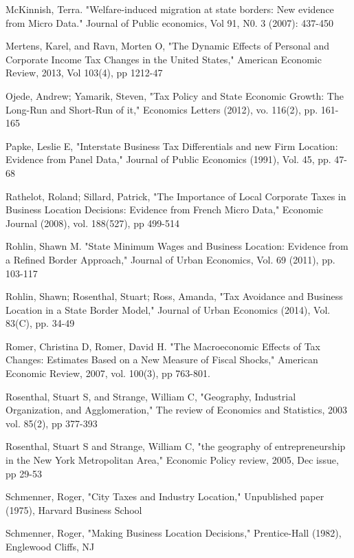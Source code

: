 \documentclass[12pt,a4paper]{article}
\begin{document}
\begin{thebibliography}{99}
McKinnish, Terra. "Welfare-induced migration at state borders: New evidence from Micro Data." Journal of Public economics, Vol 91, N0. 3 (2007): 437-450

Mertens, Karel, and Ravn, Morten O, "The Dynamic Effects of Personal and Corporate Income Tax Changes in the United States," American Economic Review, 2013, Vol 103(4), pp 1212-47

Ojede, Andrew; Yamarik, Steven, "Tax Policy and State Economic Growth: The Long-Run and Short-Run of it," Economics Letters (2012), vo. 116(2), pp. 161-165

Papke, Leslie E, "Interstate Business Tax Differentials and new Firm Location: Evidence from Panel Data," Journal of Public Economics (1991), Vol. 45, pp. 47-68

Rathelot, Roland; Sillard, Patrick, "The Importance of Local Corporate Taxes in Business Location Decisions: Evidence from French Micro Data," Economic Journal (2008), vol. 188(527), pp 499-514

Rohlin, Shawn M. "State Minimum Wages and Business Location: Evidence from a Refined Border Approach," Journal of Urban Economics, Vol. 69 (2011), pp. 103-117

Rohlin, Shawn; Rosenthal, Stuart; Ross, Amanda, "Tax Avoidance and Business Location in a State Border Model," Journal of Urban Economics (2014), Vol. 83(C), pp. 34-49

Romer, Christina D, Romer, David H. "The Macroeconomic Effects of Tax Changes: Estimates Based on a New Measure of Fiscal Shocks," American Economic Review, 2007, vol. 100(3), pp 763-801.

Rosenthal, Stuart S, and Strange, William C, "Geography, Industrial Organization, and Agglomeration," The review of Economics and Statistics, 2003 vol. 85(2), pp 377-393

Rosenthal, Stuart S and Strange, William C, "the geography of entrepreneurship in the New York Metropolitan Area," Economic Policy review, 2005, Dec issue, pp 29-53

Schmenner, Roger, "City Taxes and Industry Location," Unpublished paper (1975), Harvard Business School

Schmenner, Roger, "Making Business Location Decisions," Prentice-Hall (1982), Englewood Cliffs, NJ


\end{thebibliography}
\end{document}
